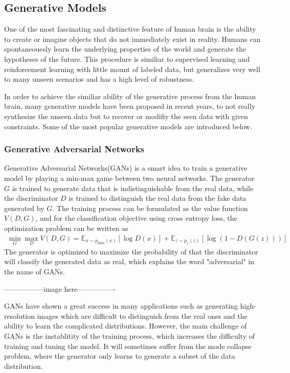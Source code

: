 \documentclass[12pt,DIV14,BCOR12mm,a4paper,footinclude=false,headinclude,parskip=half-,twoside,openright,cleardoublepage=empty,toc=index,bibliography=totoc,listof=totoc]{scrreprt}
\numberwithin{equation}{chapter}
\begin{document}
\subsection{Generative Models}
One of the most fascinating and distinctive feature of human brain is the ability to create or imagine objects that do not immediately exist in reality. 
Humans can spontaneouesly learn the underlying properties of the world and generate the hypotheses of the future. 
This procedure is similiar to supervised learning and reinforcement learning with little mount of labeled data, 
but generalizes very well to many unseen scenarios and has a high level of robustness\cite{lamb2021brief}.

In order to achieve the similiar ability of the generative process from the human brain, many generative models have been proposed in recent years, 
to not really synthesize the unseen data but to recover or modifiy the seen data with given constraints. Some of the most popular generative models are introduced below.

\subsubsection{Generative Adversarial Networks}
Generative Adversarial Networks(GANs)\cite{goodfellow2014generative} is a smart idea to train a generative model by playing a min-max game between two neural networks.
The generator $G$ is trained to generate data that is indistinguishable from the real data, 
while the discriminator $D$ is trained to distinguish the real data from the fake data generated by $G$.
The training process can be formulated as the value function $V(D,G)$, and for the classification objective using cross entropy loss, the optimization problem can be written as
\begin{align}
  \min_{G} \max_{D} V(D,G) = \mathbb{E}_{x\sim p_{data}(x)}[\log D(x)] + \mathbb{E}_{z\sim p_{z}(z)}[\log(1-D(G(z)))]
\end{align}
The generator is optimized to maximize the probability of that the discriminator will classify the generated data as real, which explains the word "adversarial" in the name of GANs.

-----------------image here----------------

GANs have shown a great success in many applications such as generating high-resolution images which are difficult to distinguish from the real ones 
and the ability to learn the complicated distributions. However, the main challenge of GANs is the instablitity of the training process, 
which increases the difficulty of training and tuning the model. It will sometimes suffer from the mode collapse problem, 
where the generator only learns to generate a subset of the data distribution\cite{borji2018pros}.
\end{document}
